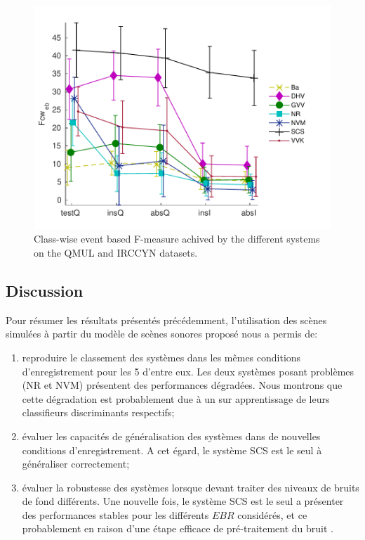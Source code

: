 \begin{figure}[t]
\includegraphics[width=1\textwidth]{gfx/ch_7/irccyn}
\caption{Class-wise event based F-measure achived by the different systems on the QMUL and IRCCYN datasets.}
\label{fig:irccyn}
\end{figure}

\subsection{Discussion}


Pour résumer les résultats présentés précédemment, l'utilisation des scènes simulées à partir du modèle de scènes sonores proposé nous a permis de:

\begin{enumerate}
\item reproduire le classement des systèmes dans les mêmes conditions d'enregistrement pour les 5 d'entre eux. Les deux systèmes posant problèmes (NR et NVM) présentent des performances dégradées. Nous montrons que cette dégradation est probablement due à un sur apprentissage de leurs  classifieurs discriminants respectifs;
\item évaluer les capacités de généralisation des systèmes dans de nouvelles conditions d'enregistrement. A cet égard, le système SCS est le seul à généraliser correctement;
\item évaluer la robustesse des systèmes lorsque devant traiter des niveaux de bruits de fond différents. Une nouvelle fois, le système SCS est le seul a présenter des performances stables pour les différents $EBR$ considérés, et ce probablement en raison d'une étape efficace de pré-traitement du bruit .
\end{enumerate}


